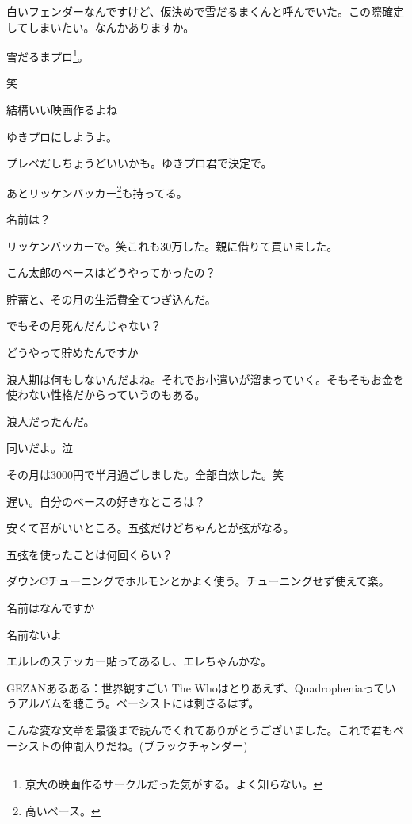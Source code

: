 \begin{multicols}{3}
白いフェンダーなんですけど、仮決めで雪だるまくんと呼んでいた。この際確定してしまいたい。なんかありますか。

雪だるまプロ\footnote{京大の映画作るサークルだった気がする。よく知らない。}。

笑

結構いい映画作るよね

ゆきプロにしようよ。

プレベだしちょうどいいかも。ゆきプロ君で決定で。
 

あとリッケンバッカー\footnote{高いベース。}も持ってる。

名前は？

リッケンバッカーで。笑これも30万した。親に借りて買いました。

こん太郎のベースはどうやってかったの？

貯蓄と、その月の生活費全てつぎ込んだ。

でもその月死んだんじゃない？

どうやって貯めたんですか

浪人期は何もしないんだよね。それでお小遣いが溜まっていく。そもそもお金を使わない性格だからっていうのもある。

浪人だったんだ。

同いだよ。泣

その月は3000円で半月過ごしました。全部自炊した。笑
 


\vspace{10mm}

遅い。自分のベースの好きなところは？

安くて音がいいところ。五弦だけどちゃんとが弦がなる。

五弦を使ったことは何回くらい？

ダウンCチューニングでホルモンとかよく使う。チューニングせず使えて楽。

名前はなんですか

名前ないよ

エルレのステッカー貼ってあるし、エレちゃんかな。


\end{multicols}

\vspace{10mm}
\noindent{}

GEZANあるある：世界観すごい
The Whoはとりあえず、Quadropheniaっていうアルバムを聴こう。ベーシストには刺さるはず。

こんな変な文章を最後まで読んでくれてありがとうございました。これで君もベーシストの仲間入りだね。(ブラックチャンダー)

